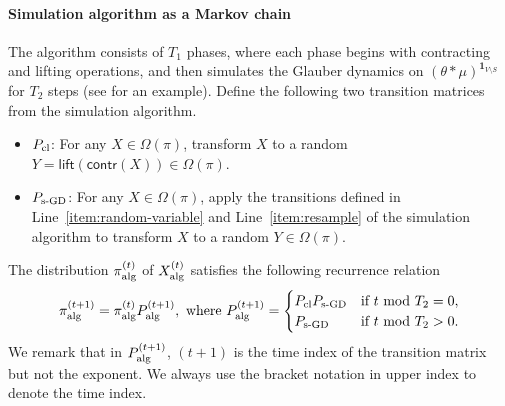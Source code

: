 \documentclass[11pt,a4paper]{article}
\newcommand{\psim}{P_{\textnormal{s-GD}}}
\theoremstyle{definition}
\def\*#1{\mathbf{#1}} %
\begin{document}
\paragraph{Simulation algorithm as a Markov chain}
The algorithm consists of $T_1$ phases, where each phase begins with contracting and lifting operations, and then simulates the Glauber dynamics on $(\theta *\mu)^{\*1_{V \setminus S}}$ for $T_2$ steps (see  for an example). Define the following two transition matrices from the simulation algorithm.
\begin{itemize}
    \item $P_{\textnormal{cl}}$: For any $X \in \Omega(\pi)$, transform $X$ to a random $Y = \textsf{lift}(\textsf{contr}(X)) \in \Omega(\pi)$.
    \item $\psim$: For any $X \in \Omega(\pi)$, apply the transitions defined in Line~\ref{item:random-variable} and Line~\ref{item:resample} of the simulation algorithm to transform $X$ to a random $Y \in \Omega(\pi)$.
\end{itemize}
The distribution $\pi^{(t)}_{\textnormal{alg}}$ of $X^{(t)}_{\textnormal{alg}}$ satisfies the following recurrence relation
\begin{align}\label{eq:recurrence-relation-simulation-algorithm}
\pi^{(t+1)}_{\textnormal{alg}} = \pi^{(t)}_{\textnormal{alg}}P_{\textnormal{alg}}^{(t+1)}, \text{ where } P_{\textnormal{alg}}^{(t+1)} = \begin{cases}
    P_{\textnormal{cl}} \psim & \text{if } t \text{ mod } T_2 = 0, \\
    \psim & \text{if } t \text{ mod } T_2 > 0.
\end{cases}
\end{align}
We remark that in $P_{\textnormal{alg}}^{(t+1)}$, $(t+1)$ is the time index of the transition matrix but not the exponent. We always use the bracket notation in upper index to denote the time index.
\end{document}
